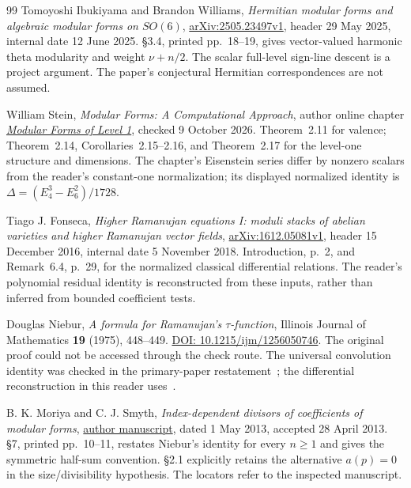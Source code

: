 \begin{thebibliography}{99}
Tomoyoshi Ibukiyama and Brandon Williams,
\emph{Hermitian modular forms and algebraic modular forms on $SO(6)$},
\href{https://arxiv.org/pdf/2505.23497}{arXiv:2505.23497v1},
header 29 May 2025, internal date 12 June 2025.
\S3.4, printed pp.~18--19, gives vector-valued harmonic theta modularity and weight $\nu+n/2$.
The scalar full-level sign-line descent is a project argument. The paper's conjectural Hermitian correspondences are not assumed.

William Stein, \emph{Modular Forms: A Computational Approach},
author online chapter \href{https://wstein.org/books/modform/modform/level_one.html}{\emph{Modular Forms of Level 1}}, checked 9 October 2026.
Theorem~2.11 for valence; Theorem~2.14, Corollaries~2.15--2.16, and Theorem~2.17 for the level-one structure and dimensions.
The chapter's Eisenstein series differ by nonzero scalars from the reader's constant-one normalization; its displayed normalized identity is $\Delta=(E_4^3-E_6^2)/1728$.

Tiago J. Fonseca,
\emph{Higher Ramanujan equations I: moduli stacks of abelian varieties and higher Ramanujan vector fields},
\href{https://arxiv.org/pdf/1612.05081}{arXiv:1612.05081v1},
header 15 December 2016, internal date 5 November 2018.
Introduction, p.~2, and Remark~6.4, p.~29, for the normalized classical differential relations. The reader's polynomial residual identity is reconstructed from these inputs, rather than inferred from bounded coefficient tests.

Douglas Niebur, \emph{A formula for Ramanujan's $\tau$-function},
Illinois Journal of Mathematics \textbf{19} (1975), 448--449.
\href{https://doi.org/10.1215/ijm/1256050746}{DOI: 10.1215/ijm/1256050746}.
The original proof could not be accessed through the check route. The universal convolution identity was checked in the primary-paper restatement~\cite{MoriyaSmyth}; the differential reconstruction in this reader uses~\cite{Fonseca,Stein}.

B. K. Moriya and C. J. Smyth,
\emph{Index-dependent divisors of coefficients of modular forms},
\href{https://webhomes.maths.ed.ac.uk/~chris/papers/Moriya_Smyth_final.pdf}{author manuscript},
dated 1 May 2013, accepted 28 April 2013.
\S7, printed pp.~10--11, restates Niebur's identity for every $n\ge1$ and gives the symmetric half-sum convention.
\S2.1 explicitly retains the alternative $a(p)=0$ in the size/divisibility hypothesis.
The locators refer to the inspected manuscript.


\end{thebibliography}
